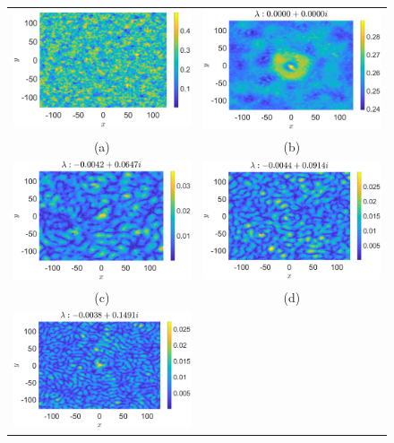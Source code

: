 \documentclass[a4paper,11pt]{article}
\begin{document}
\begin{figure}[!ht]
\centering
\begin{tabular}{cc}
\includegraphics[width=.51\textwidth]{amplitude_wwt_K_256_Lx_128_tf_1pt5e4} &\hspace{-15pt} \includegraphics[width=.51\textwidth]{mean_wwt_K_256_Lx_128_tf_1pt5e4} \\
(a) & (b)\\
\includegraphics[width=.51\textwidth]{osc1_wwtforce_K_256_Lx_128_tf_1_pt5e4} &\hspace{-15pt} \includegraphics[width=.51\textwidth]{osc2_wwtforce_K_256_Lx_128_tf_1_pt5e4} \\
(c) & (d)\\
\includegraphics[width=.51\textwidth]{osc3_wwtforce_K_256_Lx_128_tf_1_pt5e4} & \\

\end{tabular}
\end{figure}
\end{document}
